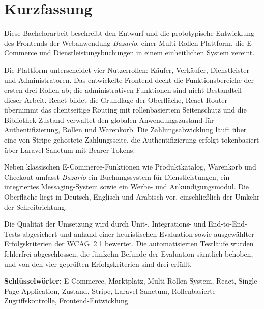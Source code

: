 \chapter*{Kurzfassung}

Diese Bachelorarbeit beschreibt den Entwurf und die prototypische
Entwicklung des Frontends der Webanwendung \textit{Bazario},
einer Multi-Rollen-Plattform, die E-Commerce und
Dienstleistungsbuchungen in einem einheitlichen System vereint.

Die Plattform unterscheidet vier Nutzerrollen: Käufer, Verkäufer,
Dienstleister und Administratoren. Das entwickelte Frontend deckt die
Funktionsbereiche der ersten drei Rollen ab; die administrativen
Funktionen sind nicht Bestandteil dieser Arbeit. React bildet die
Grundlage der Oberfläche, React Router übernimmt das clientseitige
Routing mit rollenbasiertem Seitenschutz und die Bibliothek Zustand
verwaltet den globalen Anwendungszustand für Authentifizierung,
Rollen und Warenkorb. Die Zahlungsabwicklung läuft über eine von
Stripe gehostete Zahlungsseite, die Authentifizierung erfolgt
tokenbasiert über Laravel Sanctum mit Bearer-Tokens.

Neben klassischen E-Commerce-Funktionen wie Produktkatalog,
Warenkorb und Checkout umfasst \textit{Bazario} ein
Buchungssystem für Dienstleistungen, ein integriertes
Messaging-System sowie ein Werbe- und Ankündigungsmodul. Die
Oberfläche liegt in Deutsch, Englisch und Arabisch vor,
einschließlich der Umkehr der Schreibrichtung.

Die Qualität der Umsetzung wird durch Unit-, Integrations- und
End-to-End-Tests abgesichert und anhand einer heuristischen
Evaluation sowie ausgewählter Erfolgskriterien der WCAG~2.1
bewertet. Die automatisierten Testläufe wurden fehlerfrei
abgeschlossen, die fünfzehn Befunde der Evaluation sämtlich behoben,
und von den vier geprüften Erfolgskriterien sind drei erfüllt.

\textbf{Schlüsselwörter:} E-Commerce, Marktplatz,
Multi-Rollen-System, React, Single-Page Application,
Zustand, Stripe, Laravel Sanctum, Rollenbasierte
Zugriffskontrolle, Frontend-Entwicklung